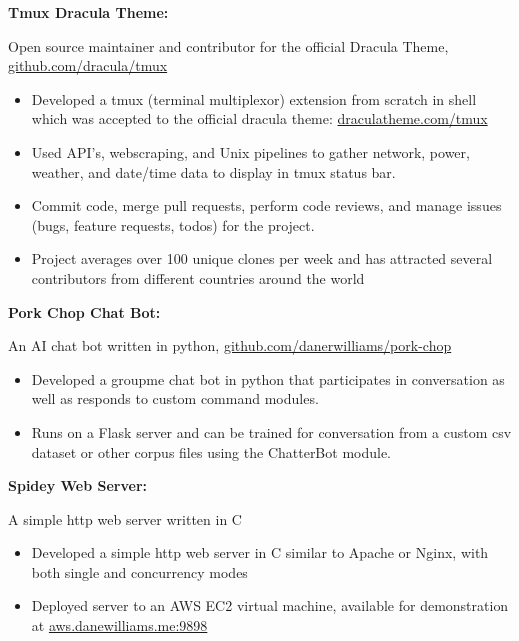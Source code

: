 \documentclass[letterpaper,10pt]{article}
\newcommand{\resumeItem}[2]{
  \item\small{
    {#1}{#2 \vspace{-2pt}}
  }
}
\newcommand{\resumeSubItem}[2]{\resumeItem{#1}{#2}\vspace{-4pt}}
\begin{document}
{      \resumeSubItem{\textbf{Tmux Dracula Theme: }}
      { Open source maintainer and contributor for the official Dracula Theme, \href{https://github.com/dracula/tmux}{github.com/dracula/tmux}
         \vspace{-5pt}
         \begin{itemize}
          \item Developed a tmux (terminal multiplexor) extension from scratch in shell which was accepted to the official dracula theme: \href{https://draculatheme.com/tmux}{draculatheme.com/tmux}
          \vspace{-2pt}
          \item Used API's, webscraping, and Unix pipelines to gather network, power, weather, and date/time data to display in tmux status bar.
          \vspace{-2pt}
          \item Commit code, merge pull requests, perform code reviews, and manage issues (bugs, feature requests, todos) for the project.
          \vspace{-2pt}
          \item Project averages over 100 unique clones per week and has attracted several contributors from different countries around the world
         \end{itemize}
      }
     \vspace{-2pt}
      \resumeSubItem{\textbf{Pork Chop Chat Bot: }}
     { An AI chat bot written in python, \href{https://github.com/danerwilliams/pork-chop}{github.com/danerwilliams/pork-chop}
        \vspace{-5pt}
        \begin{itemize}
            \item Developed a groupme chat bot in python that participates in conversation as well as responds to custom command modules.
            \vspace{-2pt}
            \item Runs on a Flask server and can be trained for conversation from a custom csv dataset or other corpus files using the ChatterBot module. 
        \end{itemize}
     }
    \vspace{-2pt}
    \resumeSubItem{\textbf{Spidey Web Server: }}
      { A simple http web server written in C
        \vspace{-5pt}
        \begin{itemize}
            \item Developed a simple http web server in C similar to Apache or Nginx, with both single and concurrency modes
            \vspace{-2pt}
            \item Deployed server to an AWS EC2 virtual machine, available for demonstration at \href{http://aws.danewilliams.me:9898}{aws.danewilliams.me:9898}
        \end{itemize}
      }

}
\end{document}
